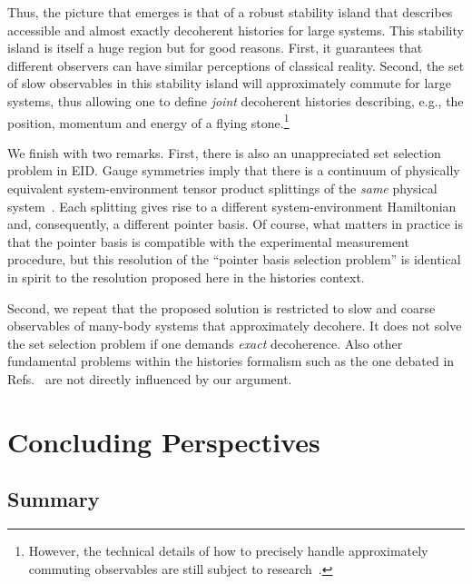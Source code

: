 \documentclass[pre,twocolumn,10pt,aps,longbibliography,nofootinbib]{revtex4-1}
\newcommand{\blue}[1]{#1}
\begin{document}
Thus, the picture that emerges is that of a robust stability island that describes accessible and almost exactly decoherent histories for large systems. This stability island is itself a huge region but for good reasons. First, it guarantees that different observers can have similar perceptions of classical reality. Second, the set of slow observables in this stability island will approximately commute for large systems, thus allowing one to define \emph{joint} decoherent histories describing, e.g., the position, momentum and energy of a flying stone.\footnote{However, the technical details of how to precisely handle approximately commuting observables are still subject to research~\cite{HastingsCMP2009, OgataJFA2013, HalpernEtAlNatComm2016}.}

We finish with two remarks. First, there is also an unappreciated set selection problem in EID. Gauge symmetries imply that there is a continuum of physically equivalent system-environment tensor product splittings of the \emph{same} physical system~\cite{StokesNazirNC2019, StokesNazirRMP2022}. Each splitting gives rise to a different system-environment Hamiltonian and, consequently, a different pointer basis. Of course, what matters in practice is that the pointer basis is compatible with the experimental measurement procedure, but this resolution of the ``pointer basis selection problem'' is identical in spirit to the resolution proposed here in the histories context.

Second, we repeat that the proposed solution is restricted to slow and coarse observables of many-body systems that approximately decohere. It does not solve the set selection problem if one demands \emph{exact} decoherence. Also other fundamental problems within the histories formalism such as the one debated in Refs.~\cite{KentPRL1997, GriffithsHartlePRL1998, KentPRL1998} are not directly influenced by our argument.

\section{Concluding Perspectives}
\label{sec perspectives}

\subsection{\blue{Summary}}
\end{document}
